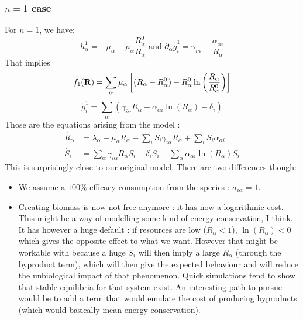 \documentclass[12pt, titlepage]{report}
\begin{document}
		\subsubsection{$n=1$ case}
		For $n=1$, we have:
		\begin{equation}
			h_\alpha^1 = -\mu_\alpha + \mu_\alpha \frac{R_\alpha^0}{R_\alpha} \text{ and } \partial_\alpha \tilde{g}_i^1 = \gamma_{i\alpha} - \frac{\alpha_{\alpha i}}{R_\alpha}
		\end{equation}
		That implies
		\begin{equation}
			f_1 (\textbf{R}) = \sum_\alpha \mu_\alpha \left[(R_\alpha-R_\alpha^0)- R_\alpha^0 \ln\left(\frac{R_\alpha}{R_\alpha^0}\right)\right]
		\end{equation}
		\begin{equation}
			\tilde{g}_i^1 = \sum_\alpha\left(\gamma_{i\alpha}R_\alpha-\alpha_{\alpha i}\ln\left(R_{\alpha}\right)-\delta_i\right)
		\end{equation}
		Those are the equations arising from the model :
		\begin{align}
			\dot{R_\alpha} &= \lambda_\alpha - \mu_\alpha R_\alpha - \sum_{i} S_i \gamma_{i\alpha} R_\alpha + \sum_i S_i \alpha_{\alpha i} \\
			\dot{S_i} &= \sum_\alpha \gamma_{i\alpha} R_\alpha S_i - \delta_i S_i- \sum_\alpha \alpha_{\alpha i} \ln\left(R_\alpha\right)S_i
		\end{align}
		This is surprisingly close to our original model. There are two differences though:
		\begin{itemize}
			\item We assume a $100\%$ efficacy consumption from the species : $\sigma_{i\alpha} = 1$.
			\item Creating biomass is now not free anymore : it has now a logarithmic cost. This might be a way of modelling some kind of energy conservation, I think. It has however a huge default : if resources are low ($R_\alpha < 1$), $\ln\left(R_\alpha\right) < 0$ which gives the opposite effect to what we want. However that might be workable with because a huge $S_i$ will then imply a large $R_\alpha$ (through the byproduct term), which will then give the expected behaviour and will reduce the unbiological impact of that phenomenon.  Quick simulations tend to show that stable equilibria for that system exist. An interesting path to pursue would be to add a term that would emulate the cost of producing byproducts (\ie which would basically mean energy conservation).
		\end{itemize}
\end{document}
